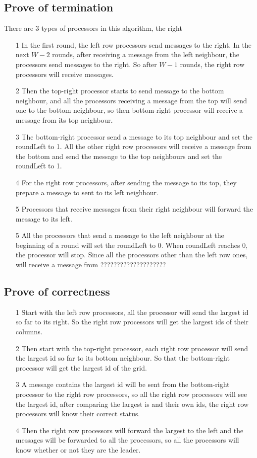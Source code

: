 \documentclass[paper=a4, fontsize=11pt]{scrartcl} %
\numberwithin{equation}{section} %
\numberwithin{figure}{section} %
\numberwithin{table}{section} %
\begin{document}
\subsection*{Prove of termination}
There are 3 types of processors in this algorithm, the right 
\begin{itemize}
	\item[1] In the first round, the left row processors send messages to the right. In the next $W - 2$ rounds, after receiving a message from the left neighbour, the processors send messages to the right. So after $W - 1$ rounds, the right row processors will receive messages. 
	\item[2] Then the top-right processor starts to send message to the bottom neighbour, and all the processors receiving a message from the top will send one to the bottom neighbour, so then bottom-right processor will receive a message from its top neighbour.
	\item[3] The bottom-right processor send a message to its top neighbour and set the roundLeft to 1. All the other right row processors will receive a message from the bottom and send the message to the top neighbours and set the roundLeft to 1. 
	\item[4] For the right row processors, after sending the message to its top, they prepare a message to sent to its left neighbour.
	\item[5] Processors that receive messages from their right neighbour will forward the message to its left.
	\item[5] All the processors that send a message to the left neighbour at the beginning of a round will set the roundLeft to 0. When roundLeft reaches 0, the processor will stop. Since all the processors other than the left row ones, will receive a message from ????????????????????
\end{itemize}
\subsection*{Prove of correctness}
\begin{itemize}
	\item[1] Start with the left row processors, all the processor will send the largest id so far to its right. So the right row processors will get the largest ids of their columns.
	\item[2] Then start with the top-right processor, each right row processor will send the largest id so far to its bottom neighbour. So that the bottom-right processor will get the largest id of the grid.
	\item[3] A message contains the largest id will be sent from the bottom-right processor to the right row processors, so all the right row processors will see the largest id, after comparing the largest is and their own ids, the right row processors will know their correct status.
	\item[4] Then the right row processors will forward the largest to the left and the messages will be forwarded to all the processors, so all the processors will know whether or not they are the leader.
\end{itemize}
\end{document}

